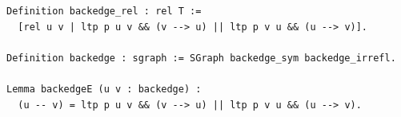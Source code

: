 \begin{lstlisting}[language=Rocq]
Definition backedge_rel : rel T :=
  [rel u v | ltp p u v && (v --> u) || ltp p v u && (u --> v)].

Definition backedge : sgraph := SGraph backedge_sym backedge_irrefl.

Lemma backedgeE (u v : backedge) :
  (u -- v) = ltp p u v && (v --> u) || ltp p v u && (u --> v).
\end{lstlisting}
